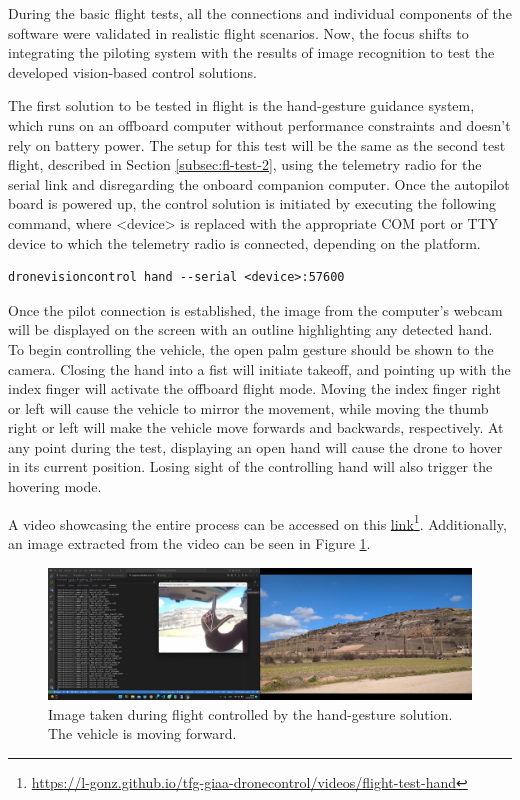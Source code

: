 During the basic flight tests, all the connections and individual components of the software were validated in realistic flight scenarios. Now, the focus shifts to integrating the piloting system with the results of image recognition to test the developed vision-based control solutions.

The first solution to be tested in flight is the hand-gesture guidance system, which runs on an offboard computer without performance constraints and doesn't rely on battery power. The setup for this test will be the same as the second test flight, described in Section \ref{subsec:fl-test-2}, using the telemetry radio for the serial link and disregarding the onboard companion computer. Once the autopilot board is powered up, the control solution is initiated by executing the following command, where <device> is replaced with the appropriate COM port or TTY device to which the telemetry radio is connected, depending on the platform.
\begin{verbatim}
dronevisioncontrol hand --serial <device>:57600
\end{verbatim}


Once the pilot connection is established, the image from the computer's webcam will be displayed on the screen with an outline highlighting any detected hand. To begin controlling the vehicle, the open palm gesture should be shown to the camera. Closing the hand into a fist will initiate takeoff, and pointing up with the index finger will activate the offboard flight mode. Moving the index finger right or left will cause the vehicle to mirror the movement, while moving the thumb right or left will make the vehicle move forwards and backwards, respectively. At any point during the test, displaying an open hand will cause the drone to hover in its current position. Losing sight of the controlling hand will also trigger the hovering mode.


A video showcasing the entire process can be accessed on this \href{https://l-gonz.github.io/tfg-giaa-dronecontrol/videos/flight-test-hand}{link}\footnote{\url{https://l-gonz.github.io/tfg-giaa-dronecontrol/videos/flight-test-hand}}. Additionally, an image extracted from the video can be seen in Figure \ref{fig:flight-test-hand}.

\begin{figure}[H]
  \centering
  \includegraphics[width=\textwidth, keepaspectratio]{img/video-field-test-hand.png}
  \caption{Image taken during flight controlled by the hand-gesture solution. The vehicle is moving forward.}
  \label{fig:flight-test-hand}
\end{figure}


